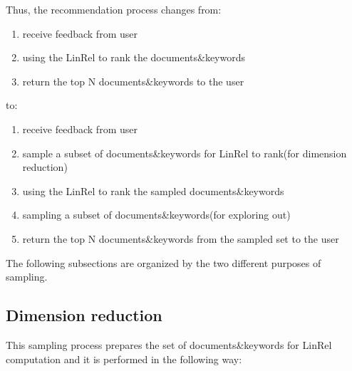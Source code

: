\documentclass[10pt,a4paper]{article}
\begin{document}
Thus, the recommendation process changes from:

\begin{enumerate}
\item receive feedback from user
\item using the LinRel to rank the documents\&keywords
\item return the top N documents\&keywords to the user
\end{enumerate}

to:

\begin{enumerate}
\item receive feedback from user
\item sample a subset of documents\&keywords for LinRel to rank(for dimension reduction)
\item using the LinRel to rank the sampled documents\&keywords
\item sampling a subset of documents\&keywords(for exploring out)
\item return the top N documents\&keywords from the sampled set to the user
\end{enumerate}

The following subsections are organized by the two different purposes of sampling.

\subsection{Dimension reduction}
This sampling process prepares the set of documents\&keywords for LinRel computation and it is performed in the following way:
\end{document}
